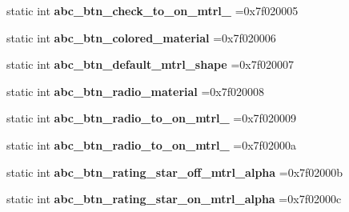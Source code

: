 \begin{DoxyCompactItemize}
static int {\bfseries abc\+\_\+btn\+\_\+check\+\_\+to\+\_\+on\+\_\+mtrl\+\_} =0x7f020005
\item 
\mbox{\label{classandroid_1_1support_1_1v7_1_1mediarouter_1_1R_1_1drawable_a5a236635fc751c9cc4eb7b50e3bc06b7}} 
static int {\bfseries abc\+\_\+btn\+\_\+colored\+\_\+material} =0x7f020006
\item 
\mbox{\label{classandroid_1_1support_1_1v7_1_1mediarouter_1_1R_1_1drawable_abc828958f6f0d1137093f2d9b3447cf4}} 
static int {\bfseries abc\+\_\+btn\+\_\+default\+\_\+mtrl\+\_\+shape} =0x7f020007
\item 
\mbox{\label{classandroid_1_1support_1_1v7_1_1mediarouter_1_1R_1_1drawable_ab0dcd5edfd549b4da0605b1cf27a7867}} 
static int {\bfseries abc\+\_\+btn\+\_\+radio\+\_\+material} =0x7f020008
\item 
\mbox{\label{classandroid_1_1support_1_1v7_1_1mediarouter_1_1R_1_1drawable_a18cb1ecd79fb153e678ce036ab2e7cbe}} 
static int {\bfseries abc\+\_\+btn\+\_\+radio\+\_\+to\+\_\+on\+\_\+mtrl\+\_} =0x7f020009
\item 
\mbox{\label{classandroid_1_1support_1_1v7_1_1mediarouter_1_1R_1_1drawable_a09eec33c49dca2b8c95a200a734fec30}} 
static int {\bfseries abc\+\_\+btn\+\_\+radio\+\_\+to\+\_\+on\+\_\+mtrl\+\_} =0x7f02000a
\item 
\mbox{\label{classandroid_1_1support_1_1v7_1_1mediarouter_1_1R_1_1drawable_a603ffeea612754573af4c252a81483db}} 
static int {\bfseries abc\+\_\+btn\+\_\+rating\+\_\+star\+\_\+off\+\_\+mtrl\+\_\+alpha} =0x7f02000b
\item 
\mbox{\label{classandroid_1_1support_1_1v7_1_1mediarouter_1_1R_1_1drawable_ad1601727f584e078c282dc0c963add71}} 
static int {\bfseries abc\+\_\+btn\+\_\+rating\+\_\+star\+\_\+on\+\_\+mtrl\+\_\+alpha} =0x7f02000c
\item 

\end{DoxyCompactItemize}
